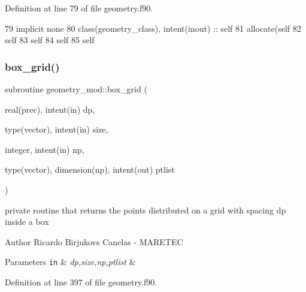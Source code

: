 Definition at line 79 of file geometry.\+f90.


\begin{DoxyCode}
79     \textcolor{keywordtype}{implicit none}
80     \textcolor{keywordtype}{class}(geometry\_class), \textcolor{keywordtype}{intent(inout)} :: self
81     \textcolor{keyword}{allocate}(self%
82     self%
83     self%
84     self%
85     self%
\end{DoxyCode}
\mbox{\label{namespacegeometry__mod_ae87e4ecff2d21a839da2b82919b5fd0b}} 
\subsubsection{\texorpdfstring{box\+\_\+grid()}{box\_grid()}}
{\footnotesize\ttfamily subroutine geometry\+\_\+mod\+::box\+\_\+grid (\begin{DoxyParamCaption}\item[{real(prec), intent(in)}]{dp,  }\item[{type(vector), intent(in)}]{size,  }\item[{integer, intent(in)}]{np,  }\item[{type(vector), dimension(np), intent(out)}]{ptlist }\end{DoxyParamCaption})\hspace{0.3cm}{\ttfamily [private]}}



private routine that returns the points distributed on a grid with spacing dp inside a box ~\newline
 

\begin{DoxyAuthor}{Author}
Ricardo Birjukovs Canelas -\/ M\+A\+R\+E\+T\+EC 
\end{DoxyAuthor}

\begin{DoxyParams}[1]{Parameters}
\mbox{\tt in}  & {\em dp,size,np,ptlist} & \\
\hline
\end{DoxyParams}


Definition at line 397 of file geometry.\+f90.


